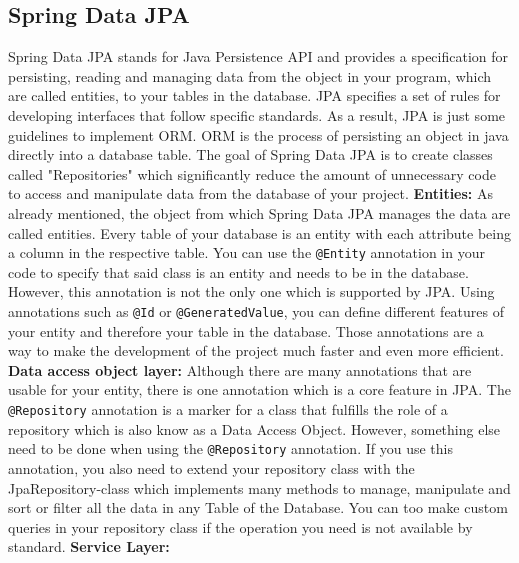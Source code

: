     \subsection{Spring Data JPA}
    Spring Data JPA stands for Java Persistence API and provides a specification for persisting, reading and managing data from the object in your program, which are called entities, to your tables in the database. JPA specifies a set of rules for developing interfaces that follow specific standards. As a result, JPA is just some guidelines to implement ORM.
    ORM is the process of persisting an object in java directly into a database table. \newline
    The goal of Spring Data JPA is to create classes called "Repositories" which significantly reduce the amount of unnecessary code to access and manipulate data from the database of your project. \newline
    \textbf{Entities:} \newline
    As already mentioned, the object from which Spring Data JPA manages the data are called entities. Every table of your database is an entity with each attribute being a column in the respective table. You can use the \texttt{@Entity} annotation in your code to specify that said class is an entity and needs to be in the database. However, this annotation is not
    the only one which is supported by JPA. Using annotations such as \texttt{@Id} or \texttt{@GeneratedValue}, you can define different features of your entity and therefore your table in the database. Those annotations are a way to make the development of the project much faster and even more efficient. \newline
    \textbf{Data access object layer:} \newline
    Although there are many annotations that are usable for your entity, there is one annotation which is a core feature in JPA. The \texttt{@Repository} annotation is a marker for a class that fulfills the role of a repository which is also know as a Data Access Object. However, something else need to be done when using the \texttt{@Repository} annotation. If you use
    this annotation, you also need to extend your repository class with the JpaRepository-class which implements many methods to manage, manipulate and sort or filter all the data in any Table of the Database. You can too make custom queries in your repository class if the operation you need is not available by standard. \newline
    \textbf{Service Layer:} \newline
